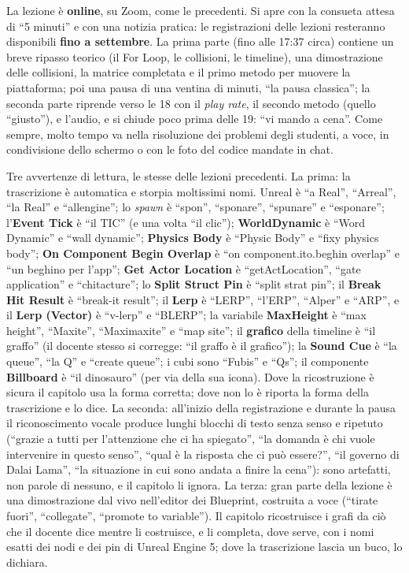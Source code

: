 La lezione è \textbf{online}, su Zoom, come le precedenti. Si apre con la consueta
attesa di ``5 minuti'' e con una notizia pratica: le registrazioni delle lezioni
resteranno disponibili \textbf{fino a settembre}. La prima parte (fino alle 17:37
circa) contiene un breve ripasso teorico (il For Loop, le collisioni, le timeline), una
dimostrazione delle collisioni, la matrice completata e il primo metodo per muovere la
piattaforma; poi una pausa di una ventina di minuti, ``la pausa classica''; la seconda
parte riprende verso le 18 con il \emph{play rate}, il secondo metodo (quello
``giusto''), e l'audio, e si chiude poco prima delle 19: ``vi mando a cena''. Come
sempre, molto tempo va nella risoluzione dei problemi degli studenti, a voce, in
condivisione dello schermo o con le foto del codice mandate in chat.

Tre avvertenze di lettura, le stesse delle lezioni precedenti. La prima: la
trascrizione è automatica e storpia moltissimi nomi. Unreal è ``a Real'', ``Arreal'',
``la Real'' e ``allengine''; lo \emph{spawn} è ``spon'', ``sponare'', ``spunare'' e
``esponare''; l'\textbf{Event Tick} è ``il TIC'' (e una volta ``il clic'');
\textbf{WorldDynamic} è ``Word Dynamic'' e ``wall dynamic''; \textbf{Physics Body} è
``Physic Body'' e ``fixy physics body''; \textbf{On Component Begin Overlap} è ``on
component.ito.beghin overlap'' e ``un beghino per l'app''; \textbf{Get Actor Location}
è ``getActLocation'', ``gate application'' e ``chitacture''; lo \textbf{Split Struct
Pin} è ``split strat pin''; il \textbf{Break Hit Result} è ``break-it result''; il
\textbf{Lerp} è ``LERP'', ``l'ERP'', ``Alper'' e ``ARP'', e il \textbf{Lerp (Vector)} è
``v-lerp'' e ``BLERP''; la variabile \textbf{MaxHeight} è ``max height'', ``Maxite'',
``Maximaxite'' e ``map site''; il \textbf{grafico} della timeline è ``il graffo'' (il
docente stesso si corregge: ``il graffo è il grafico''); la \textbf{Sound Cue} è ``la
queue'', ``la Q'' e ``create queue''; i cubi sono ``Fubis'' e ``Qs''; il componente
\textbf{Billboard} è ``il dinosauro'' (per via della sua icona). Dove la ricostruzione è
sicura il capitolo usa la forma corretta; dove non lo è riporta la forma della
trascrizione e lo dice. La seconda: all'inizio della registrazione e durante la pausa il
riconoscimento vocale produce lunghi blocchi di testo senza senso e ripetuto (``grazie a
tutti per l'attenzione che ci ha spiegato'', ``la domanda è chi vuole intervenire in
questo senso'', ``qual è la risposta che ci può essere?'', ``il governo di Dalai Lama'',
``la situazione in cui sono andata a finire la cena''): sono artefatti, non parole di
nessuno, e il capitolo li ignora. La terza: gran parte della lezione è una
dimostrazione dal vivo nell'editor dei Blueprint, costruita a voce (``tirate fuori'',
``collegate'', ``promote to variable''). Il capitolo ricostruisce i grafi da ciò che il
docente dice mentre li costruisce, e li completa, dove serve, con i nomi esatti dei nodi
e dei pin di Unreal Engine 5; dove la trascrizione lascia un buco, lo dichiara.

